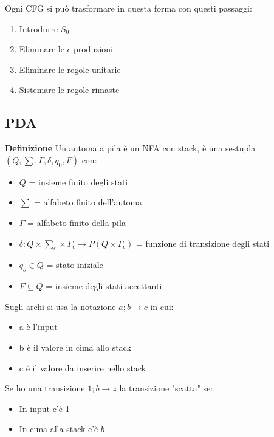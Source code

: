 \documentclass{article}
\begin{document}
\noindent Ogni CFG si può trasformare in questa forma con questi passaggi:
\begin{enumerate}
    \item Introdurre $S_0$
    \item Eliminare le $\epsilon$-produzioni
    \item Eliminare le regole unitarie
    \item Sistemare le regole rimaste\newline
\end{enumerate}

\subsection{PDA}

\textbf{Definizione} Un automa a pila è un NFA con stack, è una sestupla $(Q,\sum,\Gamma,\delta,q_0,F)$ con:
\begin{itemize}
    \item $Q$ = insieme finito degli stati
    \item $\sum$ = alfabeto finito dell'automa
    \item $\Gamma$ = alfabeto finito della pila
    \item $\delta:Q\times {\sum}_\epsilon \times {\Gamma}_\epsilon \rightarrow P(Q\times{\Gamma}_\epsilon)$ = funzione di transizione degli stati
    \item $q_o\in Q$ = stato iniziale
    \item $F\subseteq Q$ = insieme degli stati accettanti\newline
\end{itemize}

\noindent Sugli archi si usa la notazione $a;b\rightarrow c$ in cui:
\begin{itemize}
    \item a è l'input
    \item b è il valore in cima allo stack
    \item c è il valore da inserire nello stack
\end{itemize}

\newpage

\noindent Se ho una transizione $1;b\rightarrow z$ la transizione "scatta" se:
\begin{itemize}
    \item In input c'è 1
    \item In cima alla stack c'è $b$\newline
\end{itemize}
\end{document}
